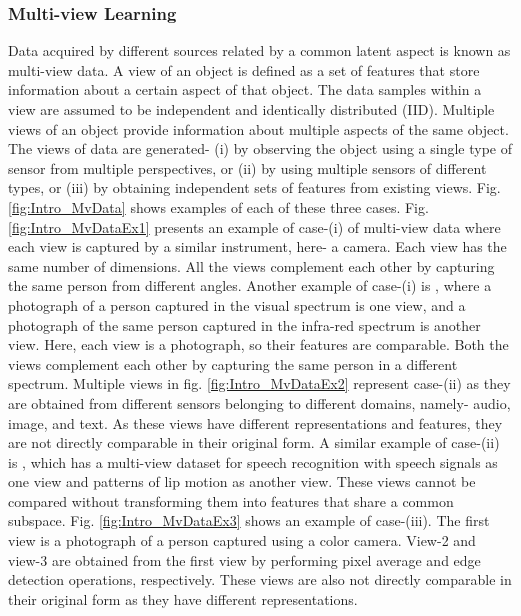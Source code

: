 \subsubsection*{Multi-view Learning}
\label{ssubs:Intro_Mv}
Data acquired by different sources related by a common latent aspect is known as multi-view data. A view of an object is defined as a set of features that store information about a certain aspect of that object. The data samples within a view are assumed to be independent and identically distributed (IID). Multiple views of an object provide information about multiple aspects of the same object. The views of data are generated- (i) by observing the object using a single type of sensor from multiple perspectives, or (ii) by using multiple sensors of different types, or (iii) by obtaining independent sets of features from existing views. Fig. \ref{fig:Intro_MvData} shows examples of each of these three cases. Fig. \ref{fig:Intro_MvDataEx1} presents an example of case-(i) of multi-view data where each view is captured by a similar instrument, here- a camera. Each view has the same number of dimensions. All the views complement each other by capturing the same person from different angles. Another example of case-(i) is \cite{ChingovskaEAM16}, where a photograph of a person captured in the visual spectrum is one view, and a photograph of the same person captured in the infra-red spectrum is another view. Here, each view is a photograph, so their features are comparable. Both the views complement each other by capturing the same person in a different spectrum. Multiple views in fig. \ref{fig:Intro_MvDataEx2} represent case-(ii) as they are obtained from different sensors belonging to different domains, namely- audio, image, and text. As these views have different representations and features, they are not directly comparable in their original form. A similar example of case-(ii) is \cite{deSaB98}, which has a multi-view dataset for speech recognition with speech signals as one view and patterns of lip motion as another view. These views cannot be compared without transforming them into features that share a common subspace. Fig. \ref{fig:Intro_MvDataEx3} shows an example of case-(iii). The first view is a photograph of a person captured using a color camera. View-2 and view-3 are obtained from the first view by performing pixel average and edge detection operations, respectively. These views are also not directly comparable in their original form as they have different representations.



